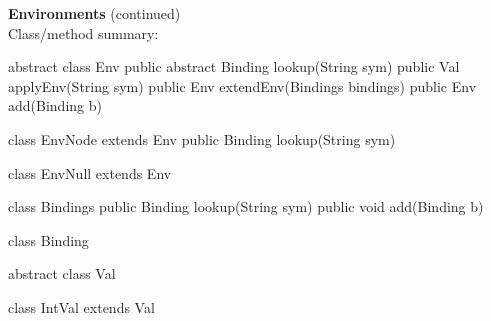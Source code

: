 \begin{minipage}[t]{\sw}
\slidenumber
\LARGE
{\bf Environments} (continued)\\[1.5ex]
Class/method summary:
{\Large
\begin{qv}
abstract class Env
    public abstract Binding lookup(String sym)
    public Val applyEnv(String sym)
    public Env extendEnv(Bindings bindings)
    public Env add(Binding b)

class EnvNode extends Env
    public Binding lookup(String sym)

class EnvNull extends Env

class Bindings
    public Binding lookup(String sym)
    public void add(Binding b)

class Binding

abstract class Val

class IntVal extends Val
\end{qv}
}
\end{minipage}
\clearpage
